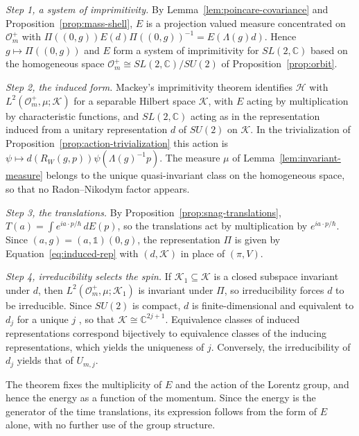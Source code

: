 \begin{remark}\label{rem:mackey-steps}
	\emph{Step 1, a system of imprimitivity.} By Lemma~\ref{lem:poincare-covariance} and Proposition~\ref{prop:mass-shell}, $E$ is a projection valued measure concentrated on $\mathcal{O}_m^+$ with $\Pi((0,g))E(d)\Pi((0,g))^{-1}=E(\Lambda(g)d)$. Hence $g\mapsto\Pi((0,g))$ and $E$ form a system of imprimitivity for $SL(2,\mathbb{C})$ based on the homogeneous space $\mathcal{O}_m^+\cong SL(2,\mathbb{C})/SU(2)$ of Proposition~\ref{prop:orbit}.
	
	\emph{Step 2, the induced form.} Mackey's imprimitivity theorem identifies $\mathcal{H}$ with $L^2(\mathcal{O}_m^+,\mu;\mathcal{K})$ for a separable Hilbert space $\mathcal{K}$, with $E$ acting by multiplication by characteristic functions, and $SL(2,\mathbb{C})$ acting as in the representation induced from a unitary representation $d$ of $SU(2)$ on $\mathcal{K}$. In the trivialization of Proposition~\ref{prop:action-trivialization} this action is $\psi\mapsto d(R_W(g,p))\psi(\Lambda(g)^{-1}p)$. The measure $\mu$ of Lemma~\ref{lem:invariant-measure} belongs to the unique quasi-invariant class on the homogeneous space, so that no Radon--Nikodym factor appears.
	
	\emph{Step 3, the translations.} By Proposition~\ref{prop:snag-translations}, $T(a)=\int e^{ia\cdot p/\hbar}\,dE(p)$, so the translations act by multiplication by $e^{ia\cdot p/\hbar}$. Since $(a,g)=(a,\mathbb{1})(0,g)$, the representation $\Pi$ is given by Equation~\eqref{eq:induced-rep} with $(d,\mathcal{K})$ in place of $(\pi,V)$.
	
	\emph{Step 4, irreducibility selects the spin.} If $\mathcal{K}_1\subseteq\mathcal{K}$ is a closed subspace invariant under $d$, then $L^2(\mathcal{O}_m^+,\mu;\mathcal{K}_1)$ is invariant under $\Pi$, so irreducibility forces $d$ to be irreducible. Since $SU(2)$ is compact, $d$ is finite-dimensional and equivalent to $d_j$ for a unique $j$ \cite[TODO-location]{TODO-Hal03}, so that $\mathcal{K}\cong\mathbb{C}^{2j+1}$. Equivalence classes of induced representations correspond bijectively to equivalence classes of the inducing representations, which yields the uniqueness of $j$. Conversely, the irreducibility of $d_j$ yields that of $U_{m,j}$.
\end{remark}

The theorem fixes the multiplicity of $E$ and the action of the Lorentz group, and hence the energy as a function of the momentum. Since the energy is the generator of the time translations, its expression follows from the form of $E$ alone, with no further use of the group structure.

